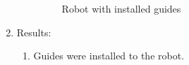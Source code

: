 \begin{enumerate}
\begin{enumerate}
\begin{figure}[H]
\begin{minipage}[h]{0.47\linewidth}
      	\end{minipage}
      	\caption{Robot with installed guides}
      \end{figure}
      
    \end{enumerate}
    
	\item Results: 
	\begin{enumerate}
	  \item Guides were installed to the robot. 
	  

\end{enumerate}
\end{enumerate}
